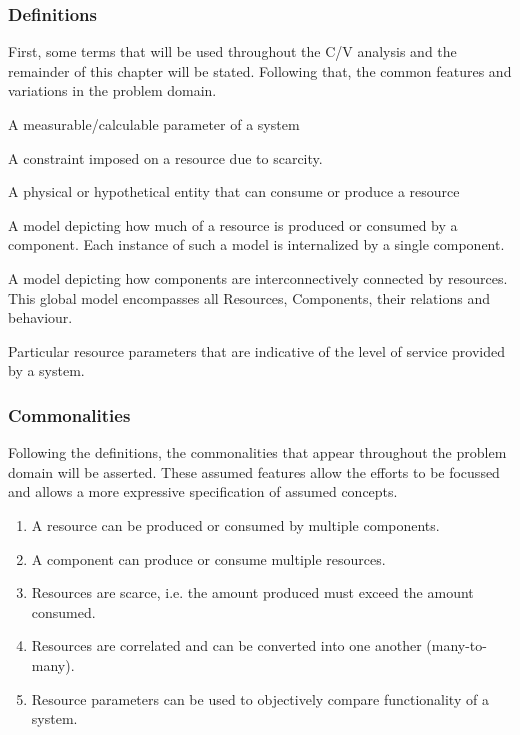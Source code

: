 \subsubsection{Definitions}
First, some terms that will be used throughout the C/V analysis and the remainder of this chapter will be stated. Following that, the common features and variations in the problem domain.
\begin{description}[style=nextline]
\nospace
\item[Resource] A measurable/calculable parameter of a system
\item[Resource constraint] A constraint imposed on a resource due to scarcity.
\item[Component] A physical or hypothetical entity that can consume or produce a resource
\item[Resource Utilization Model (RUM)] A model depicting how much of a resource is produced or consumed by a component. Each instance of such a model is internalized by a single component.
\item[Resource Distribution Model (RDM)] A model depicting how components are interconnectively connected by resources. This global model encompasses all Resources, Components, their relations and behaviour. 
\item[Quality of Service (QoS)] Particular resource parameters that are indicative of the level of service provided by a system.
\end{description}
\subsubsection{Commonalities}
Following the definitions, the commonalities that appear throughout the problem domain will be asserted. These assumed features allow the efforts to be focussed and allows a more expressive specification of assumed concepts.
\begin{enumerate}[label=C\rdmid .\arabic*]
\nospace
\item \label{c:1resource_multiplex} A resource can be produced or consumed by multiple components.
\item \label{c:2component_multiplex} A component can produce or consume multiple resources.
\item \label{c:3scarce} Resources are scarce, i.e. the amount produced must exceed the amount consumed.
\item \label{c:4res_transf} Resources are correlated and can be converted into one another (many-to-many).
\item \label{c:5optimize} Resource parameters can be used to objectively compare functionality of a system.
\end{enumerate}

